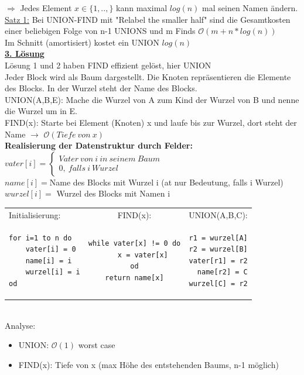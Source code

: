 \documentclass[a4paper]{article}
\newcommand{\oh}[1]{$\mathcal{O}(#1)$}
\begin{document}
$\Rightarrow$ Jedes Element $x\in \{1,..,\}$ kann maximal $log(n)$ mal seinen Namen ändern.\\
\underline{Satz 1:}
Bei UNION-FIND mit "Relabel the smaller half" sind die Gesamtkosten einer beliebigen Folge von n-1 UNIONS und m Finds \oh{m+n*log(n)}\\
Im Schnitt (amortisiert) kostet ein UNION $log(n)$\\
\underline{\textbf{3. Lösung}}\\
Lösung 1 und 2 haben FIND effizient gelöst, hier UNION\\
Jeder Block wird als Baum dargestellt. Die Knoten repräsentieren die Elemente des Blocks. In der Wurzel steht der Name des Blocks.\\
UNION(A,B,E): Mache die Wurzel von A zum Kind der Wurzel von B und nenne die Wurzel um in E.\\
FIND(x): Starte bei Element (Knoten) x und laufe bis zur Wurzel, dort steht der Name $\rightarrow$ \oh{Tiefe\ von\ x}\\
\textbf{Realisierung der Datenstruktur durch Felder:}\\
$vater[i]=\left\lbrace \begin{array}{c}Vater\ von\ i\ in\ seinem\ Baum\\ 0,\ falls\ i\ Wurzel\end{array}\right.$\\ %
$name[i]=$Name des Blocks mit Wurzel i (at nur Bedeutung, falls i Wurzel)\\
$wurzel[i]=$ Wurzel des Blocks mit Namen i\\
\begin{tabular}{ l |c| r }
Initialisierung: & FIND(x): & UNION(A,B,C):\\
\begin{lstlisting}
for i=1 to n do
	vater[i] = 0
	name[i] = i
	wurzel[i] = i
od
\end{lstlisting}
&
\begin{lstlisting}
while vater[x] != 0 do
	x = vater[x]
od
return name[x]
\end{lstlisting}&
\begin{lstlisting}
r1 = wurzel[A]
r2 = wurzel[B]
vater[r1] = r2
name[r2] = C
wurzel[C] = r2
\end{lstlisting}

\end{tabular}\\
Analyse:
\begin{itemize}
\item UNION: \oh{1} worst case
\item FIND(x): Tiefe von x (max Höhe des entstehenden Baums, n-1 möglich)
\end{itemize}
\end{document}
